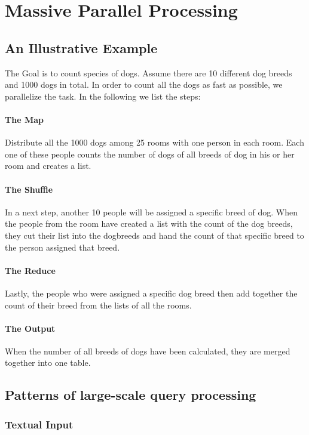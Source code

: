 \section{Massive Parallel Processing}

\subsection{An Illustrative Example}

The Goal is to count species of dogs. Assume there are 10 different dog breeds and 1000 dogs in total. In order to count all the dogs as fast as possible, we parallelize the task. In the following we list the steps:

\paragraph{The Map}
Distribute all the 1000 dogs among 25 rooms with one person in each room. Each one of these people counts the number of dogs of all breeds of dog in his or her room and creates a list.

\paragraph{The Shuffle}
In a next step, another 10 people will be assigned a specific breed of dog. When the people from the room have created a list with the count of the dog breeds, they cut their list into the dogbreeds and hand the count of that specific breed to the person assigned that breed. 

\paragraph{The Reduce}
Lastly, the people who were assigned a specific dog breed then add together the count of their breed from the lists of all the rooms.

\paragraph{The Output}
When the number of all breeds of dogs have been calculated, they are merged together into one table.


\subsection{Patterns of large-scale query processing}

\subsubsection{Textual Input}

